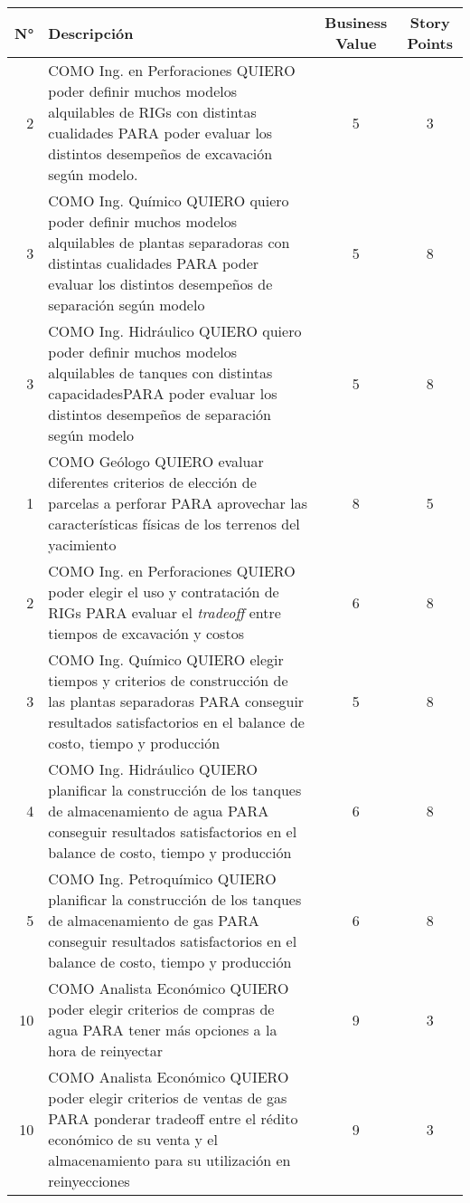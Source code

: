 \begin{center}
  \begin{tabular}{| r | p{10cm} | c | c | }
    \hline
    N° & Descripción & Business Value & Story Points\\  \hline

    2  & COMO Ing. en Perforaciones QUIERO poder definir muchos modelos alquilables de RIGs con distintas cualidades PARA poder evaluar los distintos desempeños de excavación según modelo. & 5 & 3 \\ \hline

    3  & COMO Ing. Químico QUIERO quiero poder definir muchos modelos alquilables de plantas separadoras con distintas cualidades PARA poder evaluar los distintos desempeños de separación según modelo & 5 & 8\\ \hline

    3  & COMO Ing. Hidráulico QUIERO quiero poder definir muchos modelos alquilables de tanques con distintas capacidadesPARA poder evaluar los distintos desempeños de separación según modelo & 5 & 8\\ \hline

    1  & COMO Geólogo QUIERO evaluar diferentes criterios de elección de parcelas a perforar PARA aprovechar las características físicas de los terrenos del yacimiento & 8 & 5\\  \hline

    2  & COMO Ing. en Perforaciones QUIERO poder elegir el uso y contratación de RIGs PARA evaluar el \textit{tradeoff} entre tiempos de excavación y costos & 6 & 8\\ \hline

    3  & COMO Ing. Químico QUIERO elegir tiempos y criterios de construcción de las plantas separadoras PARA conseguir resultados satisfactorios en el balance de costo, tiempo y producción & 5 & 8\\ \hline

    4 & COMO Ing. Hidráulico QUIERO planificar la construcción de los tanques de almacenamiento de agua PARA conseguir resultados satisfactorios en el balance de costo, tiempo y producción & 6 & 8\\ \hline

    5 & COMO Ing. Petroquímico QUIERO planificar la construcción de los tanques de almacenamiento de gas
    PARA conseguir resultados satisfactorios en el balance de costo, tiempo y producción & 6 & 8\\ \hline

    10 & COMO Analista Económico QUIERO poder elegir criterios de compras de agua PARA
    tener más opciones a la hora de reinyectar & 9 & 3\\ \hline

    10 & COMO Analista Económico QUIERO poder elegir criterios de ventas de gas PARA
    ponderar tradeoff entre el rédito económico de su venta y el almacenamiento para su utilización en reinyecciones & 9 & 3\\ \hline

    \end{tabular}
\end{center}


